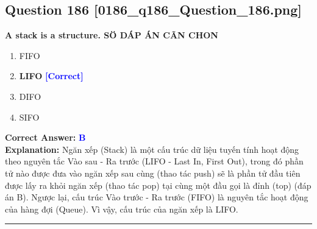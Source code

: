 \documentclass[11pt,a4paper]{article}
\begin{document}
\begin{minipage}{\textwidth}
\subsection*{Question 186 \quad \footnotesize{[0186\_q186\_Question\_186.png]}}
\noindent \textbf{A stack is a structure. SÖ DÁP ÁN CÃN CHON}

\begin{enumerate}[label=\Alph*.]
    \item FIFO
    \item \textbf{LIFO} \hfill \textcolor{blue}{\textbf{[Correct]}}
    \item DIFO
    \item SIFO
\end{enumerate}

\noindent \textbf{Correct Answer:} \textcolor{blue}{\textbf{B}} \\[2pt]
\noindent \textbf{Explanation:} Ngăn xếp (Stack) là một cấu trúc dữ liệu tuyến tính hoạt động theo nguyên tắc Vào sau - Ra trước (LIFO - Last In, First Out), trong đó phần tử nào được đưa vào ngăn xếp sau cùng (thao tác push) sẽ là phần tử đầu tiên được lấy ra khỏi ngăn xếp (thao tác pop) tại cùng một đầu gọi là đỉnh (top) (đáp án B). Ngược lại, cấu trúc Vào trước - Ra trước (FIFO) là nguyên tắc hoạt động của hàng đợi (Queue). Vì vậy, cấu trúc của ngăn xếp là LIFO.

\par\vspace{0.3cm}
\hrule
\vspace{0.3cm}
\end{minipage}
\end{document}
